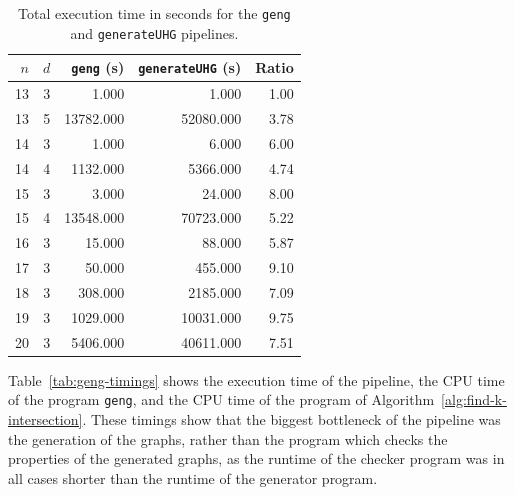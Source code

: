 \begin{table}[ht]
\centering
\caption{Total execution time in seconds for the \texttt{geng} and \texttt{generateUHG} pipelines.}
\label{tab:timing-comparison}
\begin{tabular}{rrr r r}
\toprule
$n$ & $d$ & \texttt{geng} (s) & \texttt{generateUHG} (s) & Ratio \\
\midrule
13 & 3 & 1.000 & 1.000 & 1.00 \\
13 & 5 & 13782.000 & 52080.000 & 3.78 \\
14 & 3 & 1.000 & 6.000 & 6.00 \\
14 & 4 & 1132.000 & 5366.000 & 4.74 \\
15 & 3 & 3.000 & 24.000 & 8.00 \\
15 & 4 & 13548.000 & 70723.000 & 5.22 \\
16 & 3 & 15.000 & 88.000 & 5.87 \\
17 & 3 & 50.000 & 455.000 & 9.10 \\
18 & 3 & 308.000 & 2185.000 & 7.09 \\
19 & 3 & 1029.000 & 10031.000 & 9.75 \\
20 & 3 & 5406.000 & 40611.000 & 7.51 \\
\bottomrule
\end{tabular}
\end{table}

Table~\ref{tab:geng-timings} shows the execution time of the pipeline, the CPU time of the program \texttt{geng}, and the CPU time of the program of Algorithm~\ref{alg:find-k-intersection}. These timings show that the biggest bottleneck of the pipeline was the generation of the graphs, rather than the program which checks the properties of the generated graphs, as the runtime of the checker program was in all cases shorter than the runtime of the generator program.


